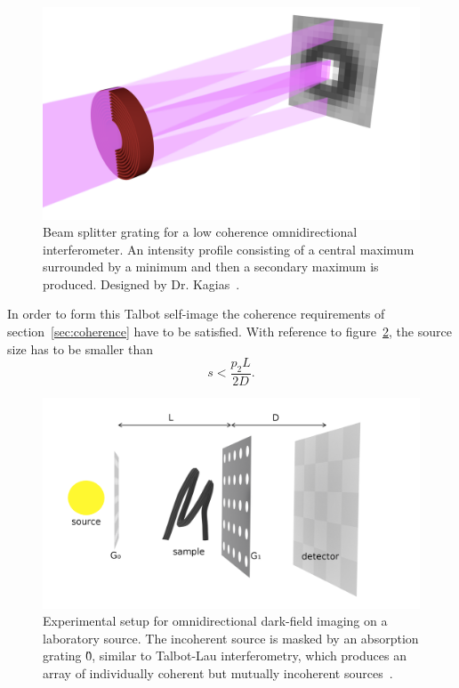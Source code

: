 \begin{figure}[htb]
    \centering
    \includegraphics[width=\textwidth]{gfx/omnidirectional/unit_cell.png}
    \caption{Beam splitter grating for a low coherence omnidirectional
    interferometer. An intensity profile consisting of a central maximum
surrounded by a minimum and then a secondary maximum is produced. Designed
by Dr. Kagias~\parencite{kagias2018omnidir}.}
    \label{fig:beam-splitter}
\end{figure}

In order to form this Talbot self-image the coherence requirements of
section~\ref{sec:coherence} have to be satisfied. With reference to
figure~\ref{fig:omnidirectional-lab}, the source size has to be
smaller than
\begin{equation}
    s < \frac{p_2L}{2D}.
    \label{eq:source.size.omnidirectional}
\end{equation}

\begin{figure}[htb]
    \centering
    \includegraphics[width=\textwidth]{gfx/omnidirectional/schematic-with-arrows.png}
    \caption{Experimental setup for omnidirectional dark-field imaging on a
    laboratory source. The incoherent source is masked by an absorption
grating \G0, similar to Talbot-Lau interferometry, which produces an array
of individually coherent but mutually incoherent
sources~\parencite{kagias2018omnidir}.}
    \label{fig:omnidirectional-lab}
\end{figure}

